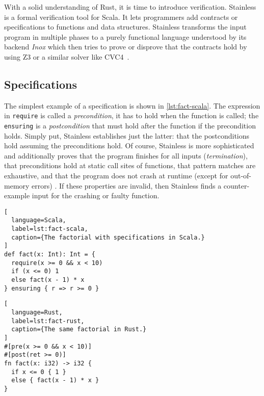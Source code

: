 With a solid understanding of Rust, it is time to introduce verification.
Stainless \cite{stainless} is a formal verification tool for Scala. It lets
programmers add contracts or specifications to functions and data structures.
Stainless transforms the input program in multiple phases to a purely functional
language understood by its backend \emph{Inox} \cite{inox} which then tries to
prove or disprove that the contracts hold by using Z3 \cite{z3} or a similar
solver like CVC4~\cite{cvc4}.

\subsection{Specifications}

The simplest example of a specification is shown in \autoref{lst:fact-scala}.
The expression in \lstinline!require! is called a \emph{precondition}, it has to
hold when the function is called; the \lstinline!ensuring! is a
\emph{postcondition} that must hold after the function if the precondition
holds. Simply put, Stainless establishes just the latter: that the
postconditions hold assuming the preconditions hold. Of course, Stainless is
more sophisticated and additionally proves that the program finishes for all
inputs (\emph{termination}), that preconditions hold at static call sites of
functions, that pattern matches are exhaustive, and that the program does not
crash at runtime (except for out-of-memory errors) \cite{stainless-doc}. If
these properties are invalid, then Stainless finds a counter-example input for
the crashing or faulty function.

\noindent\begin{minipage}[t]{.47\textwidth}
\begin{lstlisting}[
  language=Scala,
  label=lst:fact-scala,
  caption={The factorial with specifications in Scala.}
]
def fact(x: Int): Int = {
  require(x >= 0 && x < 10)
  if (x <= 0) 1
  else fact(x - 1) * x
} ensuring { r => r >= 0 }
\end{lstlisting}
\end{minipage}\hfill
\begin{minipage}[t]{.47\textwidth}
\begin{lstlisting}[
  language=Rust,
  label=lst:fact-rust,
  caption={The same factorial in Rust.}
]
#[pre(x >= 0 && x < 10)]
#[post(ret >= 0)]
fn fact(x: i32) -> i32 {
  if x <= 0 { 1 }
  else { fact(x - 1) * x }
}
\end{lstlisting}
\end{minipage}

